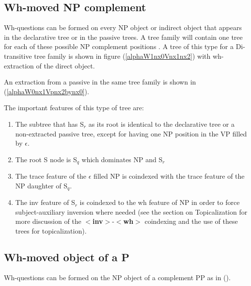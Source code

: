 \subsection{Wh-moved NP complement}
\label{NP-extr}
Wh-questions can be formed on every NP object or indirect object that
appears in the declarative tree or in the passive trees.  A tree
family will contain one tree for each of these possible NP complement positions
. A tree of this type for a
Di-transitive tree family is shown in figure (\ref{alphaW1nx0Vnx1nx2}) with wh-extraction of the
direct object. 

\begin{figure}[htbp]
\end{figure}

An extraction from  a passive in the
same tree family is shown in (\ref{alphaW0nx1Vpnx2bynx0}).  

\begin{figure}[htbp]
\end{figure}

The important features
of this type of tree are:
\begin{enumerate}
\item The subtree that has S$_{r}$ as its root is identical to the
declarative tree or a non-extracted passive tree, except for having
one NP position in the VP filled by $\epsilon$.
\item The root S node is S$_{q}$ which dominates NP and S$_{r}$
\item The trace feature of the $\epsilon$ filled NP is coindexed with
the trace feature of the NP daughter of S$_{q}$.
\item The inv feature of S$_{r}$ is coindexed to the wh feature of NP
in order to force subject-auxiliary inversion where needed (see the
section on Topicalization for more discussion of the {\bf
$<$inv$>$}-{\bf$<$wh$>$} coindexing
and the use of these trees for topicalization).
\end{enumerate}




\subsection{Wh-moved object of a P}
Wh-questions can be formed on the NP object of a complement PP as in
().

